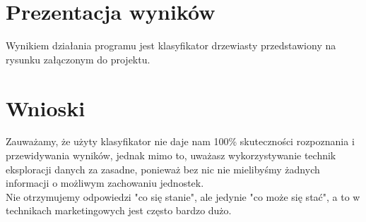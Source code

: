 \documentclass[a4paper,12pt]{article}
\begin{document}
\section{Prezentacja wyników}
Wynikiem działania programu jest klasyfikator drzewiasty przedstawiony na rysunku załączonym do projektu.
\section{Wnioski}
Zauważamy, że użyty klasyfikator nie daje nam 100\% skuteczności rozpoznania i przewidywania wyników, jednak mimo to, uważasz wykorzystywanie technik eksploracji danych za zasadne, ponieważ bez nic nie mielibyśmy żadnych informacji o możliwym zachowaniu jednostek.\\
Nie otrzymujemy odpowiedzi "co się stanie", ale jedynie "co może się stać", a to w technikach marketingowych jest często bardzo dużo.
\end{document}
